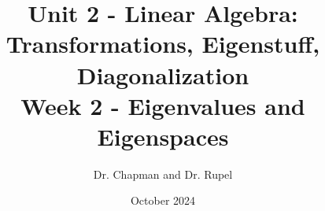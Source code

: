 \documentclass{article}
\title{Unit 2 - Linear Algebra: Transformations, Eigenstuff, Diagonalization \\ Week 2 - Eigenvalues and Eigenspaces}
\author{Dr. Chapman and Dr. Rupel}
\date{October 2024}
\begin{document}
\maketitle
\section{}
\begin{align}
\end{align}
\section{}
\section{}
\end{document}
